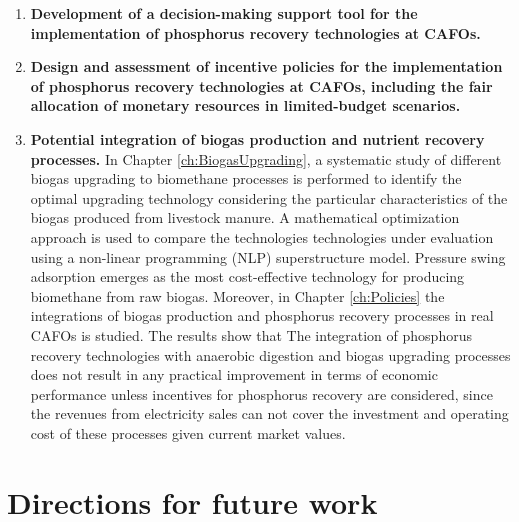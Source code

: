 \begin{enumerate}[font=\bfseries]
	\item \textbf{Development of a decision-making support tool for the implementation of phosphorus recovery technologies at CAFOs.}
	
	
	
	\item \textbf{Design and assessment of incentive policies for the implementation of phosphorus recovery technologies at CAFOs, including the fair allocation of monetary resources in limited-budget scenarios.}
	
	\item \textbf{Potential integration of biogas production and nutrient recovery processes.} In Chapter \ref{ch:BiogasUpgrading}, a systematic study of different biogas upgrading to biomethane processes is performed to identify the optimal upgrading technology considering the particular characteristics of the biogas produced from livestock manure.  A mathematical optimization approach is used to compare the technologies technologies under evaluation using a non-linear programming (NLP) superstructure model. Pressure swing adsorption emerges as the most cost-effective technology for producing biomethane from raw biogas. Moreover, in Chapter \ref{ch:Policies} the integrations of biogas production and phosphorus recovery processes in real CAFOs is studied. The results show that The integration of phosphorus recovery technologies with anaerobic 	digestion and biogas upgrading processes does not result in any practical 	improvement in terms of economic performance unless incentives for 	phosphorus recovery are considered, since the revenues from electricity sales can not cover the investment and operating cost of these processes	given current market values.
\end{enumerate}







\section{Directions for future work}
